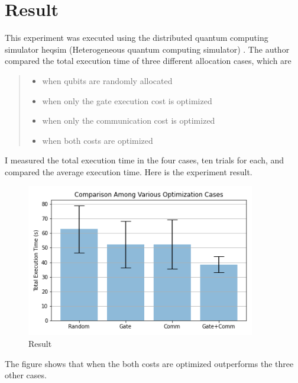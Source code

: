 \newpage
\section{Result}
This experiment was executed using the distributed quantum computing simulator heqsim (Heterogeneous quantum computing simulator) \cite{heqsim}. The author compared the total execution time of three different allocation cases, which are 
 
 \begin{quote}
 \begin{itemize}
  \item when qubits are randomly allocated
  \item when only the gate execution cost is optimized
  \item when only the communication cost is optimized
  \item when both costs are optimized
 \end{itemize}
\end{quote}

I measured the total execution time in the four cases, ten trials for each, and compared the average execution time.  Here is the experiment result.

  \begin{figure}[h]
  		\begin{center}
  			\includegraphics[width=10cm]{img/first_experiment_plot.png}
			\caption{Result}
		\end{center}
\end{figure}

The figure shows that when the both costs are optimized outperforms the three other cases.
 
